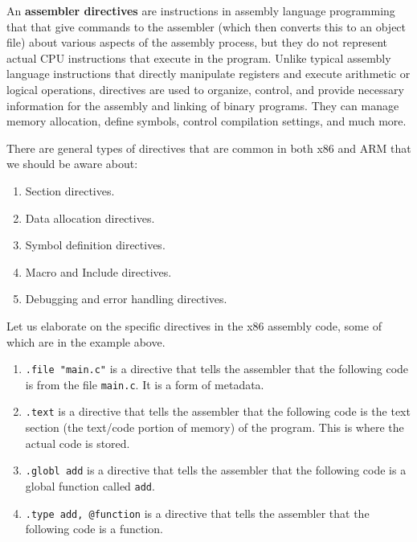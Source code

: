     \begin{definition}
      An \textbf{assembler directives} are instructions in assembly language programming that that give commands to the assembler (which then converts this to an object file) about various aspects of the assembly process, but they do not represent actual CPU instructions that execute in the program. Unlike typical assembly language instructions that directly manipulate registers and execute arithmetic or logical operations, directives are used to organize, control, and provide necessary information for the assembly and linking of binary programs. They can manage memory allocation, define symbols, control compilation settings, and much more. 

      There are general types of directives that are common in both x86 and ARM that we should be aware about: 
      \begin{enumerate}
        \item Section directives. 
        \item Data allocation directives. 
        \item Symbol definition directives. 
        \item Macro and Include directives. 
        \item Debugging and error handling directives. 
      \end{enumerate}
    \end{definition}

    \begin{example}
      Let us elaborate on the specific directives in the x86 assembly code, some of which are in the example above. 
      \begin{enumerate}
        \item \texttt{.file "main.c"} is a directive that tells the assembler that the following code is from the file \texttt{main.c}. It is a form of metadata. 
        \item \texttt{.text} is a directive that tells the assembler that the following code is the text section (the text/code portion of memory) of the program. This is where the actual code is stored. 
        \item \texttt{.globl add} is a directive that tells the assembler that the following code is a global function called \texttt{add}.
        \item \texttt{.type add, @function} is a directive that tells the assembler that the following code is a function.
      \end{enumerate}
    \end{example}

